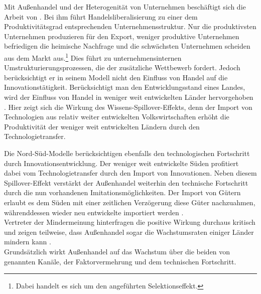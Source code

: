 Mit Au{\ss}enhandel und der Heterogenit{\"a}t von Unternehmen beschäftigt sich die Arbeit von \citet{Melitz.2003}. Bei ihm f{\"u}hrt Handelsliberalisierung zu einer dem Produktivit{\"a}tsgrad entsprechenden Unternehmensstruktur. Nur die produktivsten Unternehmen produzieren f{\"u}r den Export, weniger produktive Unternehmen befriedigen die heimische Nachfrage und die schw{\"a}chsten Unternehmen scheiden aus dem Markt aus.\footnote{Dabei handelt es sich um den angeführten Selektionseffekt.} Dies führt zu unternehmensinternen Umstrukturierungsprozessen, die der zusätzliche Wettbewerb fordert. Jedoch ber{\"u}cksichtigt er in seinem Modell nicht den Einfluss von Handel auf die Innovationst{\"a}tigkeit.\newline
Berücksichtigt man den Entwicklungsstand eines Landes, wird der Einfluss von Handel in weniger weit entwickelten L{\"a}nder hervorgehoben \citep{Pavcnik.2002}. Hier zeigt sich die Wirkung des Wissens-Spillover-Effekts, denn der Import von Technologien aus relativ weiter entwickelten Volkswirtschaften erh{\"o}ht die Produktivit{\"a}t der weniger weit entwickelten Ländern durch den Technologietransfer. \newline 


Die Nord-Süd-Modelle berücksichtigen ebenfalls den technologischen Fortschritt durch Innovationsentwicklung. Der weniger weit entwickelte Süden profitiert dabei vom Technologietransfer durch den Import von Innovationen. Neben diesem Spillover-Effekt verstärkt der Au{\ss}enhandel weiterhin den technische Fortschritt durch die nun vorhandenen Imitationsmöglichkeiten. Der Import von Gütern erlaubt es dem Süden mit einer zeitlichen Verzögerung diese Güter nachzuahmen, währenddessen wieder neu entwickelte importiert werden \citep{Grossman.1991a,Krugman.1990}.\\
Vertreter der Mindermeinung  hinterfragen die positive Wirkung durchaus kritisch und zeigen teilweise, dass Au{\ss}enhandel sogar die Wachstumsraten einiger L{\"a}nder mindern kann \citep{RodriguezCaballero.2000,Matsuyama.,Young.1991,Galor.2008}.\bigskip\\


Grundsätzlich wirkt Au{\ss}enhandel auf das Wachstum {\"u}ber die beiden von \citet{Gandolfo.1998} genannten Kan{\"a}le, der Faktorvermehrung und dem technischen Fortschritt.\\


